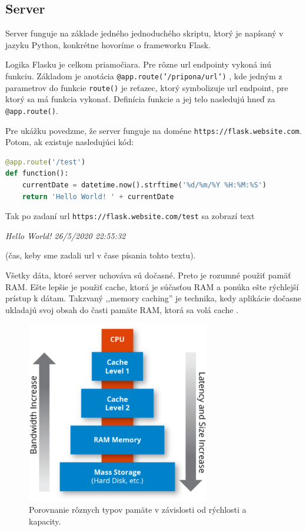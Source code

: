 \subsection{Server}
Server funguje na základe jedného jednoduchého skriptu, ktorý je napísaný v jazyku Python, konkrétne hovoríme o frameworku Flask.

Logika Flasku je celkom priamočiara. Pre rôzne url endpointy vykoná inú funkciu. Základom je anotácia \texttt{@app.route('/pripona/url')} \cite{flask_approute}, kde jedným z parametrov do funkcie \texttt{route()} je reťazec, ktorý symbolizuje url endpoint, pre ktorý sa má funkcia vykonať. Definícia funkcie a jej telo nasledujú hneď za \texttt{@app.route()}. 

Pre ukážku povedzme, že server funguje na doméne \texttt{https://flask.website.com}. Potom, ak existuje nasledujúci kód:
\newline
\begin{lstlisting}[language=Python, basicstyle=\small]
@app.route('/test')
def function():
    currentDate = datetime.now().strftime('%d/%m/%Y %H:%M:%S')
    return 'Hello World! ' + currentDate
\end{lstlisting}
\leavevmode\newline
Tak po zadaní url \texttt{https://flask.website.com/test} sa zobrazí text

\begin{center}
    \textit{Hello World! 26/5/2020 22:55:32}
\end{center}
(čas, keby sme zadali url v čase písania tohto textu).

Všetky dáta, ktoré server uchováva sú dočasné. Preto je rozumné použiť pamäť RAM. Ešte lepšie je použiť cache, ktorá je súčasťou RAM a ponúka ešte rýchlejší prístup k dátam. Takzvaný ,,memory caching'' je technika, kedy aplikácie dočasne ukladajú svoj obsah do časti pamäte RAM, ktorá sa volá cache \cite{cache}.

\begin{figure}[ht]
  \centering
  \includegraphics[width=8cm]{img/cache.png}
  \caption{Porovnanie rôznych typov pamäte v závislosti od rýchlosti a kapacity.}
  \label{cache}
\end{figure}

